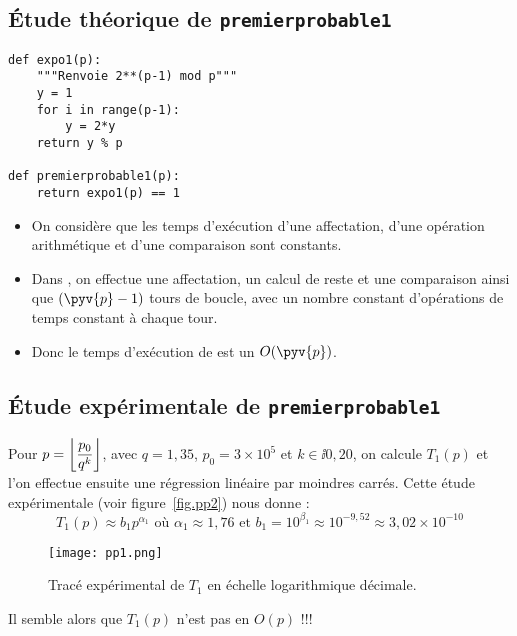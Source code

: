 \subsection{Étude théorique de \texttt{premierprobable1}}


\begin{lstlisting}
def expo1(p):
    """Renvoie 2**(p-1) mod p"""
    y = 1
    for i in range(p-1):
        y = 2*y
    return y % p

def premierprobable1(p):
    return expo1(p) == 1
\end{lstlisting}

\begin{itemize}
\item[\textbullet] On considère que les temps d'exécution d'une affectation, d'une
  opération arithmétique et d'une comparaison sont constants.
\item[\textbullet] Dans , on effectue une affectation, un
  calcul de reste et
  une comparaison ainsi que $(\pyv{p}-1)$ tours de boucle, avec un
  nombre constant d'opérations de temps constant à chaque tour.
\item[\textbullet] Donc le temps d'exécution de  est un
  $O(\pyv{p})$.
\end{itemize}

\subsection{Étude expérimentale de \texttt{premierprobable1}}
Pour $p = \left\lfloor\dfrac{p_0}{q^k}\right\rfloor$, avec $q = 1,35$, $p_0 = 3\times 10^5$ et $k\in\ii{0,20}$, on calcule $T_1(p)$ et l'on effectue ensuite une régression linéaire par moindres carrés. Cette étude expérimentale (voir figure~\ref{fig.pp2}) nous donne :
\begin{equation*}
  T_{1}(p)\approx b_{1} p^{\alpha_{1}}
  \text{ où }\alpha_{1}\approx 1,76
  \text{ et }b_{1} = 10^{\beta_{1}} \approx 10^{-9,52}
  \approx 3,02 \times 10^{-10}
\end{equation*}
\begin{figure}[!h]
  \begin{center}
    \texttt{[image: pp1.png]}
    \caption{Tracé expérimental de $T_1$ en échelle logarithmique décimale.}
    \label{fig.pp1}
  \end{center}
\end{figure}


Il semble alors que $T_1(p)$ n'est pas en $O(p)$ !!!


